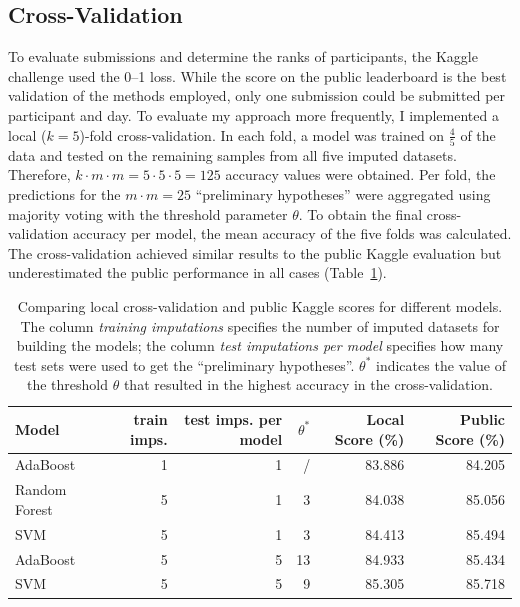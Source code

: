 \documentclass[a4paper,11pt]{article}
\begin{document}
\subsection{Cross-Validation}
\label{sec:cross}

To evaluate submissions and determine the ranks of participants, the
Kaggle challenge used the 0--1 loss. While the score on the public
leaderboard is the best validation of the methods employed, only one
submission could be submitted per participant and day. To evaluate my
approach more frequently, I implemented a local ($k = 5$)-fold
cross-validation. In each fold, a model was trained on $\frac{4}{5}$
of the data and tested on the remaining samples from all five imputed
datasets. Therefore, $k \cdot m \cdot m = 5 \cdot 5 \cdot 5 = 125$
accuracy values were obtained. Per fold, the predictions for the
$m \cdot m = 25$ ``preliminary hypotheses'' were aggregated using
majority voting with the threshold parameter $\theta$. To obtain the
final cross-validation accuracy per model, the mean accuracy of the
five folds was calculated. The cross-validation achieved similar
results to the public Kaggle evaluation but underestimated the public
performance in all cases (Table~\ref{tab:localpublic}).

\begin{table}[h]
  \centering
  \begin{tabular}{lrrrrr}
    \toprule
    Model        & train imps. & test imps. per model & $\theta^*$ & Local Score (\%) & Public Score (\%) \\
    \midrule
    AdaBoost      & 1              & 1                    & /        & 83.886           & 84.205            \\
    Random Forest & 5              & 1                    & 3        & 84.038           & 85.056            \\
    SVM           & 5              & 1                    & 3        & 84.413           & 85.494            \\
    AdaBoost      & 5              & 5                    & 13       & 84.933           & 85.434            \\
    SVM           & 5              & 5                    & 9       & 85.305           & 85.718            \\
    \bottomrule
  \end{tabular}
  \caption{{Comparing local cross-validation and public Kaggle
      scores for different models. The column \emph{training imputations} specifies the
      number of imputed datasets for building the models; the column
      \emph{test imputations per model} specifies how many test sets
      were used to get the ``preliminary hypotheses''. $\theta^*$
      indicates the value of the threshold $\theta$ that resulted in the highest accuracy in the cross-validation.}}
  \label{tab:localpublic}
\end{table}
\end{document}
